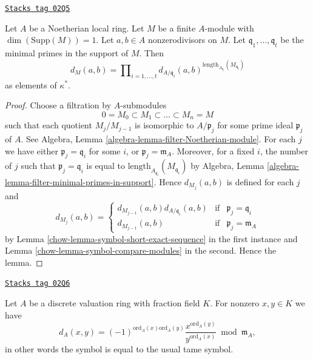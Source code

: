 \begin{lemma}
\label{chow-lemma-compute-symbol-M}
\href{https://stacks.math.columbia.edu/tag/02Q5}{\texttt{Stacks tag 02Q5}}

Let $A$ be a Noetherian local ring.
Let $M$ be a finite $A$-module with $\dim(\text{Supp}(M)) = 1$.
Let $a, b \in A$ nonzerodivisors on $M$.
Let $\mathfrak q_1, \ldots, \mathfrak q_t$ be the minimal
primes in the support of $M$. Then
$$
d_M(a, b)
=
\prod\nolimits_{i = 1, \ldots, t}
d_{A/\mathfrak q_i}(a, b)^{
\text{length}_{A_{\mathfrak q_i}}(M_{\mathfrak q_i})}
$$
as elements of $\kappa^*$.
\end{lemma}

\begin{proof}

Choose a filtration by $A$-submodules
$$
0 = M_0 \subset M_1 \subset \ldots \subset M_n = M
$$
such that each quotient $M_j/M_{j - 1}$ is isomorphic
to $A/\mathfrak p_j$ for some prime ideal $\mathfrak p_j$
of $A$. See Algebra, Lemma \ref{algebra-lemma-filter-Noetherian-module}.
For each $j$ we have either $\mathfrak p_j = \mathfrak q_i$
for some $i$, or $\mathfrak p_j = \mathfrak m_A$. Moreover,
for a fixed $i$, the number of $j$ such that
$\mathfrak p_j = \mathfrak q_i$ is equal to
$\text{length}_{A_{\mathfrak q_i}}(M_{\mathfrak q_i})$ by
Algebra, Lemma \ref{algebra-lemma-filter-minimal-primes-in-support}.
Hence $d_{M_j}(a, b)$ is defined for each $j$ and
$$
d_{M_j}(a, b)
=
\left\{
\begin{matrix}
d_{M_{j - 1}}(a, b) d_{A/\mathfrak q_i}(a, b) &
\text{if} & \mathfrak p_j = \mathfrak q_i \\
d_{M_{j - 1}}(a, b) & \text{if} & \mathfrak p_j = \mathfrak m_A
\end{matrix}
\right.
$$
by Lemma \ref{chow-lemma-symbol-short-exact-sequence} in the first instance
and Lemma \ref{chow-lemma-symbol-compare-modules} in the second. Hence the lemma.
\end{proof}

\begin{lemma}
\label{chow-lemma-symbol-is-usual-tame-symbol}
\href{https://stacks.math.columbia.edu/tag/02Q6}{\texttt{Stacks tag 02Q6}}

Let $A$ be a discrete valuation ring with fraction field $K$.
For nonzero $x, y \in K$ we have
$$
d_A(x, y)
=
(-1)^{\text{ord}_A(x)\text{ord}_A(y)}
\frac{x^{\text{ord}_A(y)}}{y^{\text{ord}_A(x)}} \bmod \mathfrak m_A,
$$
in other words the symbol is equal to the usual tame symbol.
\end{lemma}

